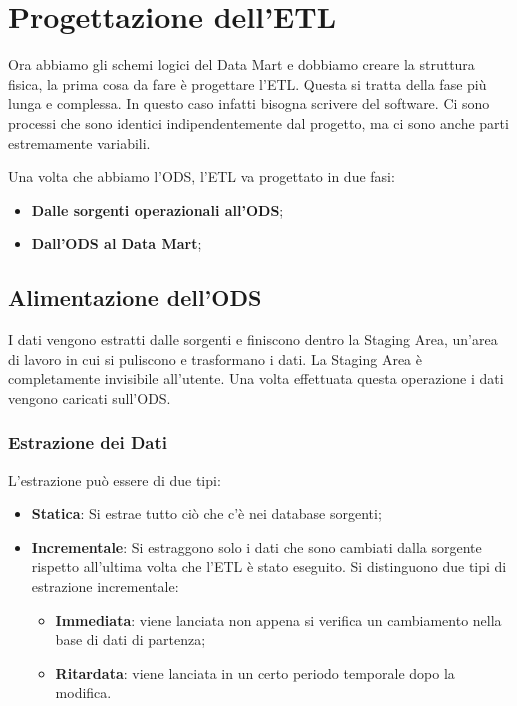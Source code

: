 \section{Progettazione dell'ETL}
Ora abbiamo gli schemi logici del Data Mart e dobbiamo creare la struttura fisica, la prima cosa da fare è progettare l'ETL. Questa si tratta della fase più lunga e complessa. In questo caso infatti bisogna scrivere del software. Ci sono processi che sono identici indipendentemente dal progetto, ma ci sono anche parti estremamente variabili.

\noindent Una volta che abbiamo l'ODS, l'ETL va progettato in due fasi:
\begin{itemize}
	\item \textbf{Dalle sorgenti operazionali all'ODS};
	\item \textbf{Dall'ODS al Data Mart};
\end{itemize}

\subsection{Alimentazione dell'ODS}
I dati vengono estratti dalle sorgenti e finiscono dentro la Staging Area, un'area di lavoro in cui si puliscono e trasformano i dati. La Staging Area è completamente invisibile all'utente. Una volta effettuata questa operazione i dati vengono caricati sull'ODS.


\subsubsection{Estrazione dei Dati}

\noindent L'estrazione può essere di due tipi:
\begin{itemize}
	\item \textbf{Statica}: Si estrae tutto ciò che c'è nei database sorgenti;
	\item \textbf{Incrementale}: Si estraggono solo i dati che sono cambiati dalla sorgente rispetto all'ultima volta che l'ETL è stato eseguito. Si distinguono due tipi di estrazione incrementale:
	\begin{itemize}
		\item \textbf{Immediata}: viene lanciata non appena si verifica un cambiamento nella base di dati di partenza;
		\item \textbf{Ritardata}: viene lanciata in un certo periodo temporale dopo la modifica.
	\end{itemize}
\end{itemize}

